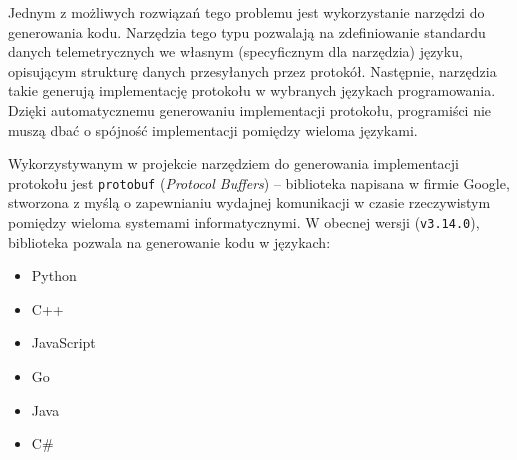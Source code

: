 Jednym z możliwych rozwiązań tego problemu jest wykorzystanie narzędzi do generowania
kodu. Narzędzia tego typu pozwalają na zdefiniowanie standardu danych telemetrycznych
we własnym (specyficznym dla narzędzia) języku, opisującym strukturę danych przesyłanych
przez protokół. Następnie, narzędzia takie generują implementację protokołu w wybranych
językach programowania. Dzięki automatycznemu generowaniu implementacji protokołu,
programiści nie muszą dbać o spójność implementacji pomiędzy wieloma językami.

Wykorzystywanym w projekcie narzędziem do generowania implementacji protokołu jest
\texttt{protobuf} (\textit{Protocol Buffers})\cite{protocol_buffers} -- biblioteka
napisana w firmie Google, stworzona z myślą o zapewnianiu wydajnej komunikacji w czasie
rzeczywistym pomiędzy wieloma systemami informatycznymi. W obecnej wersji
(\texttt{v3.14.0}), biblioteka pozwala na generowanie kodu w językach:

\begin{multicols}{2}
\begin{itemize}
	\item Python
	\item C++
	\item JavaScript
	\item Go
	\item Java
	\item C\#
\end{itemize}
\end{multicols}


